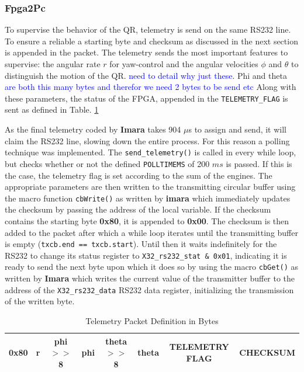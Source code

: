\documentclass{article}
\newcommand\todo[1]{\textcolor{blue}{#1}} %
\begin{document}

\subsubsection{Fpga2Pc}
To supervise the behavior of the QR, telemetry is send on the same RS232 line. To ensure a reliable a starting byte and checksum as discussed in the next section is appended in the packet. The telemetry sends the most important features to supervise: the angular rate $r$ for yaw-control and the angular velocities $\phi$ and $\theta$ to distinguish the motion of the QR.  \todo{need to detail why just these}. Phi and theta \todo{are both this many bytes and therefor we need 2 bytes to be send etc} Along with these parameters, the status of the FPGA, appended in the \texttt{TELEMETRY\_FLAG} is sent as defined in Table. \ref{tbl:TelPkgDefinition} 

As the final telemetry coded by \textbf{Imara} takes 904 $\mu$s to assign and send, it will claim the RS232 line, slowing down the entire process. For this reason a polling technique was implemented. The \texttt{send\_telemetry()} is called in every while loop, but checks whether or not the defined \texttt{POLLTIMEMS} of 200 $ms$ is passed. If this is the case, the telemetry flag is set according to the sum of the engines. The appropriate parameters are then written to the transmitting circular buffer using the macro function \texttt{cbWrite()} as written by \textbf{imara} which immediately updates the checksum by passing the address of the local variable. If the checksum contains the starting byte \textbf{0x80}, it is appended to \textbf{0x00}. The checksum is then added to the packet after which a while loop iterates until the transmitting buffer is empty (\texttt{txcb.end == txcb.start}). Until then it waits indefinitely for the RS232 to change its status register to \texttt{X32\_rs232\_stat \& 0x01}, indicating it is ready to send the next byte upon which it does so by using the macro \texttt{cbGet()} as written by \textbf{Imara} which writes the current value of the transmitter buffer to the address of the \texttt{X32\_rs232\_data} RS232 data register, initializing the transmission of the written byte. 

\begin{table}[ht]
\centering
\begin{tabular}{|c|c|c|c|c|c|c|c|}
\hline 
0x80 & r & phi $>>$ 8 & phi & theta $>>$ 8 & theta & TELEMETRY FLAG & CHECKSUM \\
\hline 
\end{tabular} 
\caption{Telemetry Packet Definition in Bytes}
\label{tbl:TelPkgDefinition}
\end{table}
\end{document}

